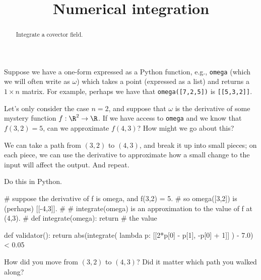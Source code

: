 \documentclass{ximera}
\title{Numerical integration}
\begin{document}
\begin{abstract}
  Integrate a covector field.
\end{abstract}
\maketitle


\begin{exercise}
  Suppose we have a one-form expressed as a Python function, e.g., \texttt{omega} (which we will often write as $\omega$) which takes a point (expressed as a list) and returns a $1 \times n$ matrix.  For example, perhaps we have that \texttt{omega([7,2,5])} is \texttt{[[5,3,2]]}.

  Let's only consider the case $n = 2$, and suppose that $\omega$ is
  the derivative of some mystery function $f : \R^2 \to \R$.  If we
  have access to \texttt{omega} and we know that $f(3,2) = 5$, can we
  approximate $f(4,3)$?  How might we go about this?

  We can take a path from $(3,2)$ to $(4,3)$, and break it up into
  small pieces; on each piece, we can use the derivative to
  approximate how a small change to the input will affect the output.
  And repeat.

  Do this in Python.

  \begin{solution}
    \begin{python}
# suppose the derivative of f is omega, and f(3,2) = 5.
# so omega([3,2]) is (perhaps) [[-4,3]].
#
# integrate(omega) is an approximation to the value of f at (4,3).
#
def integrate(omega):
  return # the value

def validator():
  return abs(integrate( lambda p: [[2*p[0] - p[1], -p[0] + 1]] ) - 7.0) < 0.05
    \end{python}
  \end{solution}

How did you move from $(3,2)$ to $(4,3)$?  Did it matter which path you walked along?

\end{exercise}
\end{document}

